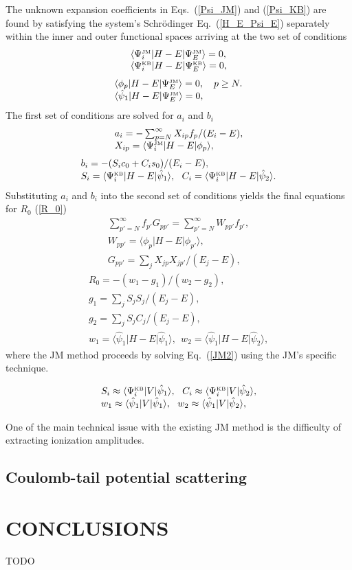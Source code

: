 \documentclass[aip
, pra
, showpacs
, aps
, twocolumn
, groupedaddress
, floatfix
]{revtex4}
\newcommand{\beq}{\begin{equation}}
\newcommand{\eeq}{\end{equation}}
\newcommand{\barr}{\begin{array}}
\newcommand{\earr}{\end{array}}
\newcommand{\JM}{\mbox{\tiny{JM}}}
\newcommand{\KB}{\mbox{\tiny{KB}}}
\begin{document}
The unknown expansion coefficients in Eqs.~(\ref{Psi_JM}) and (\ref{Psi_KB})
are found by satisfying the system's  Schr\"odinger Eq.~(\ref{H_E_Psi_E})
separately within the inner and outer functional spaces
arriving at the two set of conditions
\beq \barr{l}
\langle\Psi_i^{\JM}|H-E|\Psi_E^{\JM}\rangle= 0, \\
\langle\Psi_i^{\KB}|H-E|\Psi_E^{\KB}\rangle=0,
\earr \eeq
\beq \barr{l}
\langle\phi_p|H-E|\Psi_E^{\JM}\rangle=0 , \ \ \ p \geq N.\\
\langle \hat{\psi}_1 |H-E|\Psi_E^{\JM}\rangle=0,
\earr \eeq
The first set of conditions are solved for $a_i$ and $b_i$
\beq \barr{l}
a_i = - \sum_{p=N}^{\infty} X_{ip} f_p / (E_i-E),\\
X_{ip}=  \langle\Psi_i^{\JM}|H-E| \phi_p \rangle ,\\
\earr \eeq
\beq \barr{l}
b_i = - (S_i c_0 + C_i s_0) / (E_i-E), \\
S_i = \langle\Psi_i^{\KB}|H-E|  \hat{\psi}_1 \rangle, \ \
C_i = \langle\Psi_i^{\KB}|H-E|  \hat{\psi}_2 \rangle.
\earr \eeq
Substituting $a_i$ and $b_i$ into the second set of conditions yields the final equations for $R_0$ (\ref{R_0})
\beq \barr{l}
\sum_{p'=N}^{\infty} f_{p'}  G_{pp'} = \sum_{p'=N}^{\infty} W_{pp'} f_{p'},\\
W_{pp'}  = \langle \phi_p | H-E | \phi_{p'} \rangle,\\
G_{pp'}= \sum_j X_{jp} X_{jp'}/(E_j-E),
\label{JM2} \earr \eeq
\beq \barr{l}
R_0 = -(w_1 - g_1) / (w_2 - g_2),\\
g_1= \sum_j S_{j} S_{j}/(E_j-E),\\
g_2= \sum_j S_{j} C_{j}/(E_j-E),\\
w_1  = \langle \hat{\psi}_1 |H-E| \hat{\psi}_1 \rangle,\ \
w_2 = \langle \hat{\psi}_1 |H-E| \hat{\psi}_2 \rangle,
\earr \eeq
where the JM method proceeds by solving Eq.~(\ref{JM2}) using the JM's specific technique.


\beq \barr{l}
S_i \approx \langle\Psi_i^{\KB}|V|  \hat{\psi}_1 \rangle, \ \
C_i \approx \langle\Psi_i^{\KB}|V|  \hat{\psi}_2 \rangle,\\
w_1 \approx \langle \hat{\psi}_1 |V| \hat{\psi}_1 \rangle,\ \
w_2 \approx \langle \hat{\psi}_1 |V| \hat{\psi}_2 \rangle,
\earr \eeq


One of the main technical issue with the existing JM method is the difficulty of extracting ionization amplitudes.


\subsection{Coulomb-tail potential scattering}



\section{CONCLUSIONS}
TODO


\begin{acknowledgments}
\end{acknowledgments}





%
\end{document}
